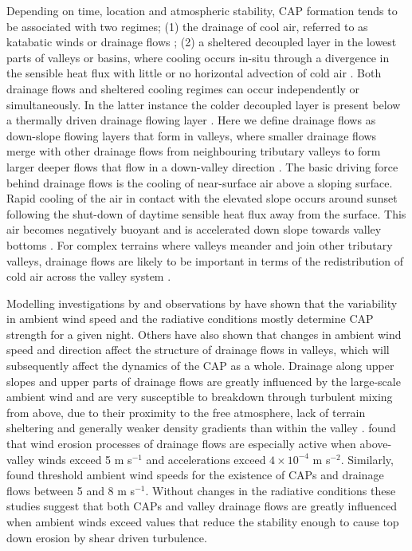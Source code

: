 \documentclass[times]{qjrms4}
\begin{document}
Depending on time, location and atmospheric stability, CAP formation tends to be associated with two regimes; (1) the drainage of cool air, referred to as katabatic winds \citep{heywood1933katabatic,manins1979katabatic} or drainage flows \citep{gudiksen1992measurements}; (2) a sheltered decoupled layer in the lowest parts of valleys or basins, where cooling occurs in-situ through a divergence in the sensible heat flux with little or no horizontal advection of cold air \citep{vosper2008numerical}. Both drainage flows and sheltered cooling regimes can occur independently or simultaneously. In the latter instance the colder decoupled layer is present below a thermally driven drainage flowing layer \citep{clements2003cold,Vosper2013narrow}. Here we define drainage flows as down-slope flowing layers that form in valleys, where smaller drainage flows merge with other drainage flows from neighbouring tributary valleys to form larger deeper flows that flow in a down-valley direction \citep{orgill1992mesoscale,Vosper2013narrow}. The basic driving force behind drainage flows is the cooling of near-surface air above a sloping surface. Rapid cooling of the air in contact with the elevated slope occurs around sunset following the shut-down of daytime sensible heat flux away from the surface. This air becomes negatively buoyant and is accelerated down slope towards valley bottoms \citep{vosper2008numerical,gudiksen1992measurements,Vosper2013narrow}. For complex terrains where valleys meander and join other tributary valleys, drainage flows are likely to be important in terms of the redistribution of cold air across the valley system \citep{vosper2008numerical}.

Modelling investigations by \citet{vosper2008numerical} and observations by \citet{sheridan2013characteristics} have shown that the variability in ambient wind speed and the radiative conditions mostly determine CAP strength for a given night. Others have also shown that changes in ambient wind speed \citep{orgill1992mesoscale} and direction \citep{coulter1989} affect the structure of drainage flows in valleys, which will subsequently affect the dynamics of the CAP as a whole. Drainage along upper slopes and upper parts of drainage flows are greatly influenced by the large-scale ambient wind and are very susceptible to breakdown through turbulent mixing from above, due to their proximity to the free atmosphere, lack of terrain sheltering and generally weaker density gradients than within the valley \citep{barr1989influence,gudiksen1992measurements}. \citet{orgill1992mesoscale} found that wind erosion processes of drainage flows are especially active when above-valley winds exceed 5 m s$^{-1}$ and accelerations exceed $4\times10^{-4}$ m s$^{-2}$. Similarly, \citet{heywood1933katabatic,gudiksen1992measurements,barr1989influence,iijima2000seasonal} found threshold ambient wind speeds for the existence of CAPs and drainage flows between 5 and 8 m s$^{-1}$. Without changes in the radiative conditions these studies suggest that both CAPs and valley drainage flows are greatly influenced when ambient winds exceed values that reduce the stability enough to cause top down erosion by shear driven turbulence. 
\end{document}
